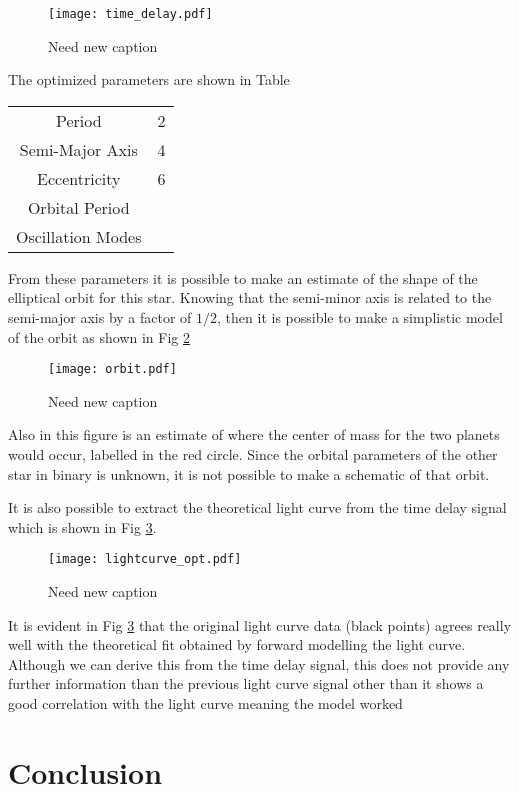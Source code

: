 \documentclass[]{article}
\begin{document}
\begin{figure}[H]
    \centering
    \texttt{[image: time\_delay.pdf]}
      \caption{Need new caption}
      \label{fig:timedelay}
\end{figure}

The optimized parameters are shown in Table 

\begin{tabular}{c|c}
\hline
    Period  & 2  \\
    Semi-Major Axis & 4\\
    Eccentricity & 6\\
    Orbital Period & \\
    Oscillation Modes & \\
\end{tabular}

\noindent
From these parameters it is possible to make an estimate of the shape of the elliptical orbit for this star. Knowing that the semi-minor axis is related to the semi-major axis by a factor of $1/2$, then it is possible to make a simplistic model of the orbit as shown in Fig \ref{fig:Orbit}

\begin{figure}[H]
    \centering
    \texttt{[image: orbit.pdf]}
      \caption{Need new caption}
      \label{fig:Orbit}
\end{figure}
Also in this figure is an estimate of where the center of mass for the two planets would occur, labelled in the red circle. Since the orbital parameters of the other star in binary is unknown, it is not possible to make a schematic of that orbit.

It is also possible to extract the theoretical light curve from the time delay signal which is shown in Fig \ref{fig:LightcurveOptimized}.
\begin{figure}[H]
    \centering
    \texttt{[image: lightcurve\_opt.pdf]}
      \caption{Need new caption}
      \label{fig:LightcurveOptimized}
\end{figure}

It is evident in Fig \ref{fig:LightcurveOptimized} that the original light curve data (black points) agrees really well with the theoretical fit obtained by forward modelling the light curve. Although we can derive this from the time delay signal, this does not provide any further information than the previous light curve signal other than it shows a good correlation with the light curve meaning the model worked

\section{Conclusion}


        

\end{document}
